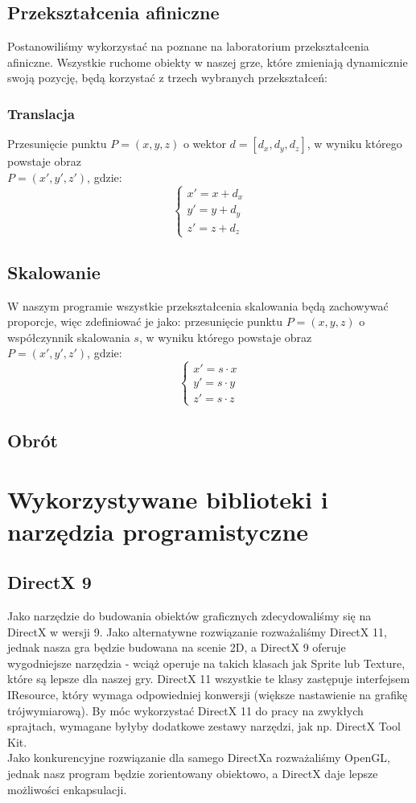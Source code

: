 \documentclass[a4paper,twoside]{article}
\begin{document}
		\subsection{Przekształcenia afiniczne}
			Postanowiliśmy wykorzystać na poznane na laboratorium przekształcenia afiniczne. Wszystkie ruchome obiekty w naszej grze, które zmieniają dynamicznie swoją pozycję, będą korzystać z trzech wybranych przekształceń:
			\subsubsection{Translacja}
				Przesunięcie punktu $ P=(x, y, z) $ o wektor $ d=[d_x, d_y, d_z] $, w wyniku którego powstaje obraz\\ $ P=(x', y', z') $, gdzie:
				$$
					\begin{cases}
						x'=x+d_x\\
						y'=y+d_y\\
						z'=z+d_z
					\end{cases}
				$$
			\subsection{Skalowanie}
				W naszym programie wszystkie przekształcenia skalowania będą zachowywać proporcje, więc zdefiniować je jako: przesunięcie punktu $ P=(x, y, z) $ o współczynnik skalowania $ s $, w wyniku którego powstaje obraz\\ $ P=(x', y', z') $, gdzie:
				$$
					\begin{cases}
						x'=s\cdot x\\
						y'=s\cdot y\\
						z'=s\cdot z
					\end{cases}
				$$
			\subsection{Obrót}
				
	
	\section{Wykorzystywane biblioteki i narzędzia programistyczne}
		\subsection{DirectX 9}
			Jako narzędzie do budowania obiektów graficznych zdecydowaliśmy się na DirectX w wersji 9. Jako alternatywne rozwiązanie rozważaliśmy DirectX 11, jednak nasza gra będzie budowana na scenie 2D, a DirectX 9 oferuje wygodniejsze narzędzia - wciąż operuje na takich klasach jak Sprite lub Texture, które są lepsze dla naszej gry. DirectX 11 wszystkie te klasy zastępuje interfejsem IResource, który wymaga odpowiedniej konwersji (większe nastawienie na grafikę trójwymiarową). By móc wykorzystać DirectX 11 do pracy na zwykłych sprajtach, wymagane byłyby dodatkowe zestawy narzędzi, jak np. DirectX Tool Kit.\\
			Jako konkurencyjne rozwiązanie dla samego DirectXa rozważaliśmy OpenGL, jednak nasz program będzie zorientowany obiektowo, a DirectX daje lepsze możliwości enkapsulacji.
\end{document}

